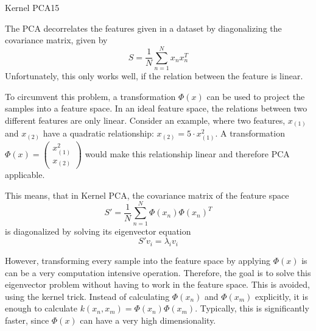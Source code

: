 \begin{questions}
\begin{question}[bonus]{Kernel PCA}{15}
\begin{answer}
The PCA decorrelates the features given in a dataset by diagonalizing the covariance matrix, given by 
\[S = \frac{1}{N} \sum_{n=1}^{N}x_n x_n^T\]
Unfortunately, this only works well, if the relation between the feature is linear.

To circumvent this problem, a transformation $\Phi (x)$ can be used to project the samples into a feature space. In an ideal feature space, the relations between two different features are only linear. Consider an example, where two features, $x_{(1)}$ and $x_{(2)}$ have a quadratic relationship: $x_{(2)} = 5 \cdot x_{(1)}^2$. A transformation $\Phi(x) = (\begin{matrix}
x_{(1)}^2\\
x_{(2)}
\end{matrix}) $ would make this relationship linear and therefore PCA applicable.

This means, that in Kernel PCA, the covariance matrix of the feature space 
\[S'=\frac{1}{N} \sum_{n=1}^{N} \Phi(x_n) \Phi(x_n)^T\]
is diagonalized by solving its eigenvector equation \[S'v_i = \lambda_i v_i\]

However, transforming every sample into the feature space by applying $\Phi(x)$ is can be a very computation intensive operation. Therefore, the goal is to solve this eigenvector problem without having to work in the feature space. This is avoided, using the kernel trick. Instead of calculating $\Phi(x_n)$ and $\Phi(x_m)$ explicitly, it is enough to calculate $k(x_n, x_m) = \Phi(x_n)\Phi(x_m)$. Typically, this is significantly faster, since $\Phi(x)$ can have a very high dimensionality.
 
\end{answer}

\end{question}

\end{questions}
